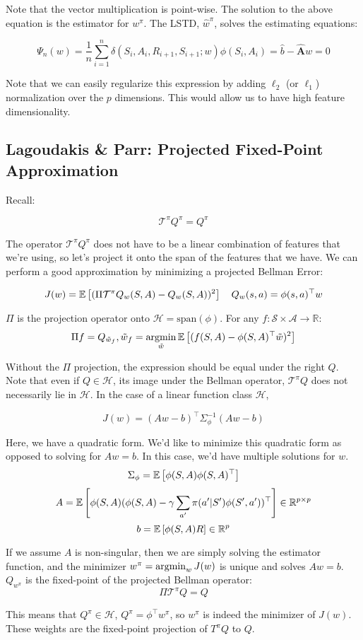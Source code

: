 \documentclass[11pt]{article}
\begin{document}
Note that the vector multiplication is point-wise. The solution to the above equation is the estimator for $w^\pi$. The LSTD, $\hat{w}^\pi$, solves the estimating equations:

$$\Psi_n(w) = \frac{1}{n} \sum_{i=1}^n \delta(S_i,A_i,R_{i+1},S_{i+1}; w) \phi(S_i, A_i) = \hat{b} - \hat{\boldsymbol{A}}w = 0$$

Note that we can easily regularize this expression by adding $\ell_2$ (or $\ell_1$) normalization over the $p$ dimensions. This would allow us to have high feature dimensionality.

\subsection{Lagoudakis \& Parr: Projected Fixed-Point Approximation}

Recall:

$$\mathcal{T}^\pi Q^\pi = Q^\pi$$

The operator $\mathcal{T}^\pi Q^\pi$ does not have to be a linear combination of features that we're using, so let's project it onto the span of the features that we have. We can perform a good approximation by minimizing a projected Bellman Error:

$$J(w) = \mathbb{E}\left[ (\Pi\mathcal{T}^\pi Q_w(S,A) - Q_w(S,A))^2 \right] \quad Q_w(s,a) = \phi(s, a)^\top w$$

$\Pi$ is the projection operator onto $\mathcal{H} = \text{span}(\phi)$. For any $f : \mathcal{S} \times \mathcal{A} \to \mathbb{R}$: 
$$\Pi f = Q_{\tilde{w}_f}, \tilde{w}_f = \operatorname*{argmin}_{\tilde{w}} \mathbb{E}\left[ (f(S,A) - \phi(S,A)^\top \tilde{w})^2 \right]$$

Without the $\Pi$ projection, the expression should be equal under the right $Q$. Note that even if $Q \in \mathcal{H}$, its image under the Bellman operator, $\mathcal{T}^\pi Q$ does not necessarily lie in $\mathcal{H}$. In the case of a linear function class $\mathcal{H}$,

$$J(w) = (Aw - b)^\top \Sigma_\phi^{-1}(Aw - b)$$

Here, we have a quadratic form. We'd like to minimize this quadratic form as opposed to solving for $Aw = b$. In this case, we'd have multiple solutions for $w$. 
$$\Sigma_\phi = \mathbb{E}\left[ \phi(S,A)\phi(S,A)^\top \right]$$
$$A = \mathbb{E}\left[ \phi(S,A)(\phi(S,A) - \gamma \sum_{a'}\pi(a'|S')\phi(S', a'))^\top \right] \in \mathbb{R}^{p \times p}$$
$$b=\mathbb{E}\left[ \phi(S,A)R \right] \in \mathbb{R}^p$$

If we assume $A$ is non-singular, then we are simply solving the estimator function, and the minimizer $w^\pi = \operatorname*{argmin}_w J(w)$ is unique and solves $Aw = b$. $Q_{w^\pi}$ is the fixed-point of the projected Bellman operator:
$$\Pi \mathcal{T}^\pi Q = Q$$

This means that $Q^\pi \in \mathcal{H}$, $Q^\pi  = \phi^\top w^\pi$, so $w^\pi$ is indeed the minimizer of $J(w)$. These weights are the fixed-point projection of $T^\pi Q$ to $Q$.



\end{document}
